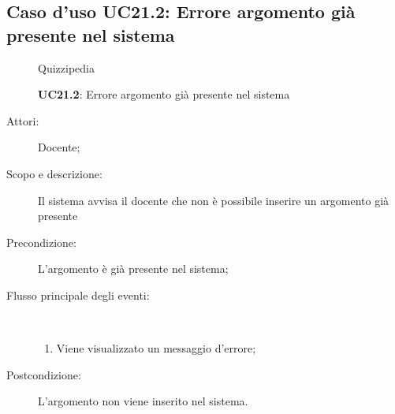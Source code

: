 \subsection{Caso d'uso UC21.2: Errore argomento già presente nel sistema}
	\begin{figure}[H]
		\centering
		\begin{resizedtikzpicture}{\textwidth}
		\begin{umlsystem}[x=0, fill=lightgray!20]{Quizzipedia}
		\end{umlsystem}
		\end{resizedtikzpicture}
		\caption{\textbf{UC21.2}: Errore argomento già presente nel sistema}
		\label{UC21.2}
	\end{figure}
\begin{description}
\item[Attori:] Docente;
\item[Scopo e descrizione:] Il sistema avvisa il docente che non è possibile inserire un argomento già presente
      \item[Precondizione:] L'argomento è già presente nel sistema;

        \item[Flusso principale degli eventi:] \ 
 \begin{enumerate}
          \item Viene visualizzato un messaggio d'errore;

      \end{enumerate}
    \item[Postcondizione:] L'argomento non viene inserito nel sistema.
  \end{description}
\hypertarget{UC21.3}{}
